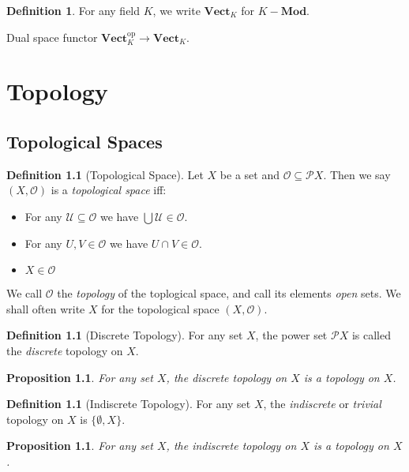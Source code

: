 \documentclass{book}
\newtheorem{prop}[ax]{Proposition}
\theoremstyle{definition}
\newtheorem{df}[ax]{Definition}
\begin{document}
\begin{df}
For any field $K$, we write $\mathbf{Vect}_K$ for $K-\mathbf{Mod}$.
\end{df}

Dual space functor $\mathbf{Vect}_K^{\mathrm{op}} \rightarrow \mathbf{Vect}_K$.

\chapter{Topology}

\section{Topological Spaces}

\begin{df}[Topological Space]
Let $X$ be a set and $\mathcal{O} \subseteq \mathcal{P} X$. Then we say $(X, \mathcal{O})$ is a \emph{topological space} iff:
\begin{itemize}
\item For any $\mathcal{U} \subseteq \mathcal{O}$ we have $\bigcup \mathcal{U} \in \mathcal{O}$.
\item For any $U, V \in \mathcal{O}$ we have $U \cap V \in \mathcal{O}$.
\item $X \in \mathcal{O}$
\end{itemize}
We call $\mathcal{O}$ the \emph{topology} of the toplogical space, and call its elements \emph{open} sets. We shall often write $X$ for the topological space $(X, \mathcal{O})$.
\end{df}

\begin{df}[Discrete Topology]
For any set $X$, the power set $\mathcal{P} X$ is called the \emph{discrete} topology on $X$.
\end{df}

\begin{prop}
For any set $X$, the discrete topology on $X$ is a topology on $X$.
\end{prop}

\begin{df}[Indiscrete Topology]
For any set $X$, the \emph{indiscrete} or \emph{trivial} topology on $X$ is  $\{ \emptyset, X \}$.
\end{df}

\begin{prop}
For any set $X$, the indiscrete topology on $X$ is a topology on $X$.
\end{prop}
\end{document}

